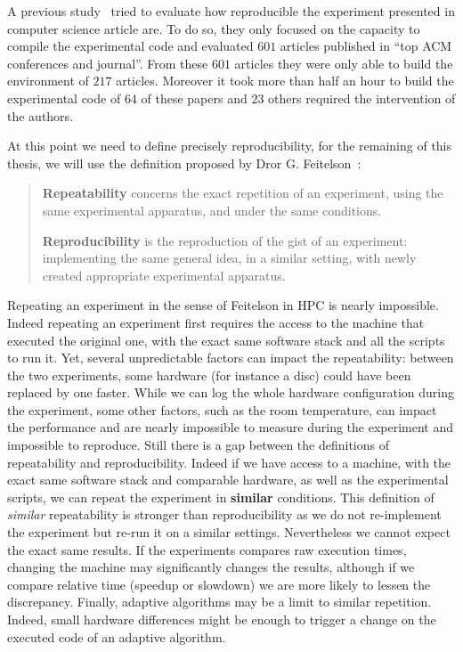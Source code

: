 A previous study~\cite{Collberg15Repeatability} tried to evaluate how reproducible the experiment presented in computer science article are.
To do so, they only focused on the capacity to compile the experimental code and evaluated $601$ articles published in “top ACM conferences and journal”.
From these $601$ articles they were only able to build the environment of $217$ articles.
Moreover it took more than half an hour to build the experimental code of $64$ of these papers and $23$ others required the intervention of the authors.

At this point we need to define precisely reproducibility, for the remaining of this thesis, we will use the definition proposed by Dror G. Feitelson~\cite{Feitelson15From}:

\begin{quote}
    \textbf{Repeatability} concerns the exact repetition of an experiment, using the same experimental apparatus, and under the same conditions.

    \textbf{Reproducibility} is the reproduction of the gist of an experiment: implementing the same general idea, in a similar setting, with newly created appropriate experimental apparatus.
\end{quote}

Repeating an experiment in the sense of Feitelson in \gls{HPC} is nearly impossible.
Indeed repeating an experiment first requires the access to the machine that executed the original one, with the exact same software stack and all the scripts to run it.
Yet, several unpredictable factors can impact the repeatability: between the two experiments, some hardware (for instance a disc) could have been replaced by one faster.
While we can log the whole hardware configuration during the experiment, some other factors, such as the room temperature, can impact the performance and are nearly impossible to measure during the experiment and impossible to reproduce.
Still there is a gap between the definitions of repeatability and reproducibility.
Indeed if we have access to a machine, with the exact same software stack and comparable hardware, as well as the experimental scripts, we can repeat the experiment in \textbf{similar} conditions.
This definition of \emph{similar} repeatability is stronger than reproducibility as we do not re-implement the experiment but re-run it on a similar settings.
Nevertheless we cannot expect the exact same results.
If the experiments compares raw execution times, changing the machine may significantly changes the results, although if we compare relative time (speedup or slowdown) we are more likely to lessen the discrepancy.
Finally, adaptive algorithms may be a limit to similar repetition.
Indeed, small hardware differences might be enough to trigger a change on the executed code of an adaptive algorithm.

